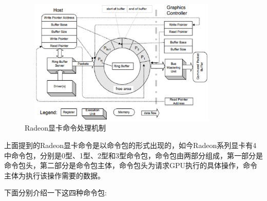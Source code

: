 \begin{figure}[H] 
  \centering
  \includegraphics[width=10cm,height=6cm]{figures/chap02/CommandBuffer}
  \caption{Radeon显卡命令处理机制}
  \label{fig:CommandBuffer}
\end{figure}

上面提到的Radeon显卡命令是以命令包的形式出现的，如今Radeon系列显卡有4中命令包，分别是0型、1型、2型和3型命令包，命令包由两部分组成，第一部分是命令包头，第二部分是命令包主体，命令包头为请求GPU执行的具体操作，命令主体为执行该操作需要的数据。

下面分别介绍一下这四种命令包\cite{Radeon-Manual}:

